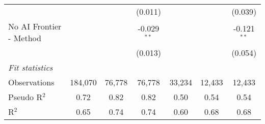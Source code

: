 \begin{tabular}{lcccccc}
                           &                &                & (0.011)       &                &                & (0.039)\\   
   No AI Frontier - Method &                &                & -0.029$^{**}$ &                &                & -0.121$^{**}$\\   
                           &                &                & (0.013)       &                &                & (0.054)\\   
   \midrule
   \emph{Fit statistics}\\
   Observations            & 184,070        & 76,778         & 76,778        & 33,234         & 12,433         & 12,433\\  
   Pseudo R$^2$            & 0.72           & 0.82           & 0.82          & 0.50           & 0.54           & 0.54\\  
   R$^2$                   & 0.65           & 0.74           & 0.74          & 0.60           & 0.68           & 0.68\\  
   

\end{tabular}
